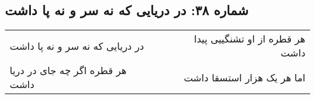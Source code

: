 \begin{center}
\section*{شماره ۳۸: در دریایی که نه سر و نه پا داشت}
\label{sec:038}
\begin{longtable}{l p{0.5cm} r}
در دریایی که نه سر و نه پا داشت
&&
هر قطره از او تشنگییی پیدا داشت
\\
هر قطره اگر چه جای در دریا داشت
&&
اما هر یک هزار استسقا داشت
\\
\end{longtable}
\end{center}
